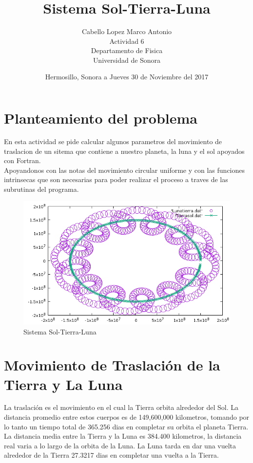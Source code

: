 \documentclass[12pt,a4paper,twoside]{article}
\author{Cabello Lopez Marco Antonio\\
Actividad 6\\
Departamento de Fisica\\
Universidad de Sonora}
\date{Hermosillo, Sonora a Jueves 30 de Noviembre del 2017}
\title{\textbf{Sistema Sol-Tierra-Luna}}
\begin{document}
\maketitle
\section{Planteamiento del problema}
En esta actividad se pide calcular algunos parametros del movimiento de traslacion de un sitema que contiene a  nuestro planeta, la luna y el sol apoyados con Fortran.\\
Apoyandonos con las notas del movimiento circular uniforme y con las funciones intrinsecas que son necesarias para poder realizar el proceso a traves de las subrutinas del programa.

\begin{figure}[h!]
  \includegraphics[width=\linewidth]{MoonEarthSun.png}
  \caption{Sistema Sol-Tierra-Luna}
  \label{fig:Grafica}
\end{figure}
\clearpage


\maketitle
\section{Movimiento de Traslación de la Tierra y La Luna}
La traslación es el movimiento en el cual la Tierra orbita alrededor del Sol. La distancia promedio entre estos cuerpos es de 149,600,000 kilometros, tomando por lo tanto un tiempo total de 365.256 dias en completar su orbita el planeta Tierra.\\
La distancia media entre la Tierra y la Luna es 384.400 kilometros, la distancia real varia a lo largo de la orbita de la Luna. La Luna tarda en dar una vuelta alrededor de la Tierra 27.3217  dias en completar una vuelta a la Tierra.\\
\end{document}

